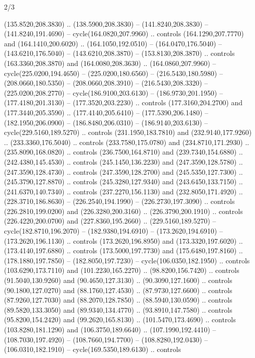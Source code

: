 \begin{flagdescription}{2/3}
\begin{scope}[xshift=0.5\flaglength,yshift=0.5\flagwidth,scale=\stretchfactor]
\begin{scope}[scale=0.001645\flagwidth,yshift=65mm,xshift=-63mm]
\begin{scope}[y=0.80pt, x=0.80pt, yscale=-1,]
\begin{scope}[cm={{1.33333,0.0,0.0,1.33333,(0.0,1e-05)}}]
  (135.8520,208.3830) .. (138.5900,208.3830) -- (141.8240,208.3830) --
  (141.8240,191.4690) -- cycle(164.0820,207.9960) .. controls
  (164.1290,207.7770) and (164.1410,200.6020) .. (164.1050,192.0510) --
  (164.0470,176.5040) -- (143.6210,176.5040) -- (143.6210,208.3870) --
  (153.8130,208.3870) .. controls (163.3360,208.3870) and (164.0080,208.3630) ..
  (164.0860,207.9960) -- cycle(225.0200,194.4650) -- (225.0200,180.6560) --
  (216.5430,180.5980) -- (208.0660,180.5350) -- (208.0660,208.3910) --
  (216.5430,208.3320) -- (225.0200,208.2770) -- cycle(186.9100,203.6130) --
  (186.9730,201.1950) -- (177.4180,201.3130) -- (177.3520,203.2230) .. controls
  (177.3160,204.2700) and (177.3440,205.3590) .. (177.4140,205.6410) --
  (177.5390,206.1480) -- (182.1950,206.0900) -- (186.8480,206.0310) --
  (186.9140,203.6130) -- cycle(229.5160,189.5270) .. controls
  (231.1950,183.7810) and (232.9140,177.9260) .. (233.3360,176.5040) .. controls
  (233.7580,175.0780) and (234.8710,171.2930) .. (235.8090,168.0820) .. controls
  (236.7500,164.8710) and (239.7340,154.6880) .. (242.4380,145.4530) .. controls
  (245.1450,136.2230) and (247.3590,128.5780) .. (247.3590,128.4730) .. controls
  (247.3590,128.2700) and (245.5350,127.7300) .. (245.3790,127.8870) .. controls
  (245.3280,127.9340) and (243.6450,133.7150) .. (241.6370,140.7340) .. controls
  (237.2270,156.1130) and (232.8050,171.4920) .. (228.3710,186.8630) --
  (226.2540,194.1990) -- (226.2730,197.3090) .. controls (226.2810,199.0200) and
  (226.3280,200.3160) .. (226.3790,200.1910) .. controls (226.4220,200.0700) and
  (227.8360,195.2660) .. (229.5160,189.5270) -- cycle(182.8710,196.2070) --
  (182.9380,194.6910) -- (173.2620,194.6910) -- (173.2620,196.1130) .. controls
  (173.2620,196.8950) and (173.3320,197.6020) .. (173.4140,197.6880) .. controls
  (173.5000,197.7730) and (175.6480,197.8160) .. (178.1880,197.7850) --
  (182.8050,197.7230) -- cycle(106.0350,182.1950) .. controls
  (103.6290,173.7110) and (101.2230,165.2270) .. (98.8200,156.7420) .. controls
  (91.5040,130.9260) and (90.4650,127.3130) .. (90.3090,127.1600) .. controls
  (90.1800,127.0270) and (88.1760,127.4530) .. (87.9730,127.6600) .. controls
  (87.9260,127.7030) and (88.2070,128.7850) .. (88.5940,130.0590) .. controls
  (89.5820,133.3050) and (89.9340,134.4770) .. (93.8910,147.7580) .. controls
  (95.8200,154.2420) and (99.2620,165.8130) .. (101.5470,173.4690) .. controls
  (103.8280,181.1290) and (106.3750,189.6640) .. (107.1990,192.4410) --
  (108.7030,197.4920) -- (108.7660,194.7700) -- (108.8280,192.0430) --
  (106.0310,182.1910) -- cycle(169.5350,189.6130) .. controls

\end{scope}
\end{scope}
\end{scope}
\end{scope}
\end{flagdescription}
